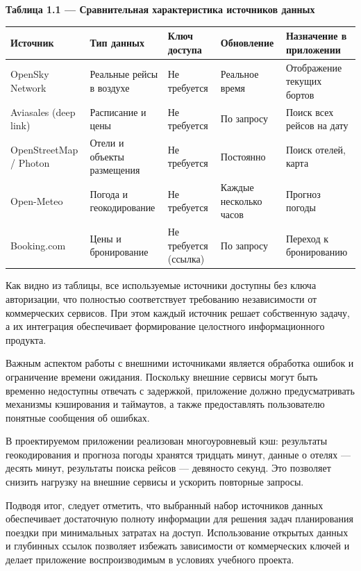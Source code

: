 \documentclass[14pt,a4paper,oneside]{extreport}
\begin{document}
\begin{table}[htbp]\centering

\textbf{Таблица 1.1 — Сравнительная характеристика источников данных}\par\vspace{4pt}

\begin{center}
\small
\begin{tabularx}{\textwidth}{|X|X|X|X|X|}
\hline
Источник & Тип данных & Ключ доступа & Обновление & Назначение в приложении \\
\hline
OpenSky Network & Реальные рейсы в воздухе & Не требуется & Реальное время & Отображение текущих бортов \\
\hline
Aviasales (deep link) & Расписание и цены & Не требуется & По запросу & Поиск всех рейсов на дату \\
\hline
OpenStreetMap / Photon & Отели и объекты размещения & Не требуется & Постоянно & Поиск отелей, карта \\
\hline
Open-Meteo & Погода и геокодирование & Не требуется & Каждые несколько часов & Прогноз погоды \\
\hline
Booking.com & Цены и бронирование & Не требуется (ссылка) & По запросу & Переход к бронированию \\
\hline
\end{tabularx}
\end{center}

\end{table}

Как видно из таблицы, все используемые источники доступны без ключа авторизации, что полностью соответствует требованию независимости от коммерческих сервисов. При этом каждый источник решает собственную задачу, а их интеграция обеспечивает формирование целостного информационного продукта.

Важным аспектом работы с внешними источниками является обработка ошибок и ограничение времени ожидания. Поскольку внешние сервисы могут быть временно недоступны отвечать с задержкой, приложение должно предусматривать механизмы кэширования и таймаутов, а также предоставлять пользователю понятные сообщения об ошибках.

В проектируемом приложении реализован многоуровневый кэш: результаты геокодирования и прогноза погоды хранятся тридцать минут, данные о отелях — десять минут, результаты поиска рейсов — девяносто секунд. Это позволяет снизить нагрузку на внешние сервисы и ускорить повторные запросы.

Подводя итог, следует отметить, что выбранный набор источников данных обеспечивает достаточную полноту информации для решения задач планирования поездки при минимальных затратах на доступ. Использование открытых данных и глубинных ссылок позволяет избежать зависимости от коммерческих ключей и делает приложение воспроизводимым в условиях учебного проекта.
\end{document}
